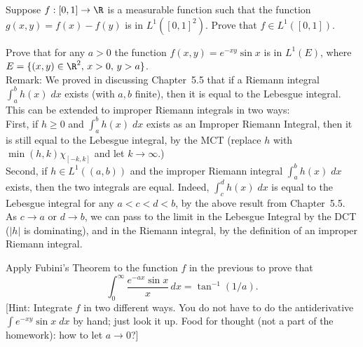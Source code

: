 \begin{hw} \label{hw:38}
Suppose $f: [0, 1] \to \R$ is a measurable function such that the function $g(x,y)= f(x) - f(y)$ is in $L^1([0, 1]^2)$. Prove that $f\in L^1([0, 1])$. \\
\end{hw}


\begin{hw} \label{hw:39}
Prove that for any $a > 0$ the function $f(x,y)= e^{-xy} \sin x$ is in $L^1(E)$, where $E= \{ (x, y) \in \R^2, \, x > 0, \, y > a \}$. \\

\noindent Remark: We proved in discussing Chapter~5.5 that if a Riemann integral $\int_a^b h(x) \;dx$ exists (with $a,b$ finite), then it is equal to the Lebesgue integral. This can be extended to improper Riemann integrals in two ways: \\

\noindent First, if $h \geq 0$ and $\int_a^b h(x) \;dx$ exists as an Improper Riemann Integral, then it is still equal to the Lebesgue integral, by the MCT (replace $h$ with $\min(h, k) \chi_{[-k, k]}$ and let $k \to \infty$.) \\

\noindent Second, if $h \in L^1((a, b))$ and the improper Riemann integral $\int_a^b h(x)\;dx$  exists, then the two integrals are equal. Indeed, $\int_c^d h(x) \;dx$ is equal to the Lebesgue integral for any $a<c<d<b$, by the above result from Chapter~5.5. As $c \to a$ or $d \to b$, we can pass to the limit in the Lebesgue Integral by the DCT ($|h|$ is dominating), and in the Riemann integral, by the definition of an improper Riemann integral. \\
\end{hw}


\begin{hw} \label{hw:40}
Apply Fubini's Theorem to the function $f$ in the previous to prove that 
        \[
        \int_0^\infty \frac{e^{-ax} \sin x}{x} \,dx = \tan^{-1} (1/a).
        \]
[Hint: Integrate $f$ in two different ways. You do not have to do the antiderivative $\int e^{-xy}\sin x \;dx$ by hand; just look it up. Food for thought (not a part of the homework): how to let $a \to 0$?] \\
\end{hw}






